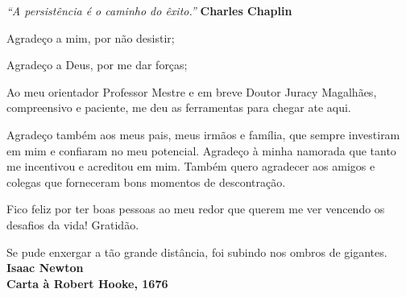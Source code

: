 
\newpage
\vspace*{\fill}
\begin{flushright}
		\textit{“A persistência é o caminho do êxito.”}
		\textbf{Charles Chaplin}
\end{flushright}

\begin{agradecimentos}

Agradeço a mim, por não desistir;

Agradeço a Deus, por me dar forças;

Ao meu orientador Professor Mestre e em breve Doutor Juracy Magalhães, compreensivo e paciente, me deu as ferramentas para chegar ate aqui.

Agradeço também aos meus pais, meus irmãos e família, que sempre investiram em mim e confiaram no meu potencial. Agradeço à minha namorada que tanto me incentivou e acreditou em mim. Também quero agradecer aos amigos e colegas que forneceram bons momentos de descontração.

Fico feliz por ter boas pessoas ao meu redor que querem me ver vencendo os desafios da vida! Gratidão.


\end{agradecimentos}

\begin{epigrafe}
    \vspace*{\fill}
	\begin{flushright}
		Se pude enxergar a tão grande distância, foi subindo nos ombros de gigantes.\\
		 \vspace{\baselineskip}
		\textbf{Isaac Newton}\\
		\textbf{Carta à Robert Hooke, 1676}
	\end{flushright}
\end{epigrafe}



